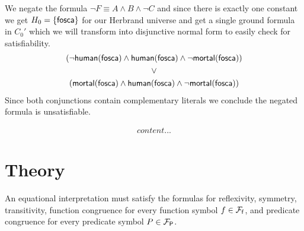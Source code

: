 

	We negate the formula $\lnot F \equiv A\land B \land\lnot C$ and since there is exactly one constant we get
	$H_0 = \{ \mathsf{fosca} \}$ for our Herbrand universe and get a single ground formula in $C_0'$
	which we will transform into 
	disjunctive normal form to easily check for satisfiability.
%
\begin{gather*}
(\lnot\mathsf{human}(\mathsf{fosca})\land\mathsf{human}(\mathsf{fosca})\land\lnot\mathsf{mortal}(\mathsf{fosca}))
\\ 
\lor
\\ 
(\mathsf{mortal}(\mathsf{fosca})\land\mathsf{human}(\mathsf{fosca})\land\lnot\mathsf{mortal}(\mathsf{fosca}))
\end{gather*}
Since both conjunctions contain complementary literals we conclude the negated formula is unsatisfiable.


\begin{gather*}
content...
\end{gather*}


\section{Theory}



	An equational interpretation must satisfy the formulas for reflexivity, symmetry, transitivity, 
	function congruence for every function symbol $f\in{{\mathcal F}_{\mathsf f}}$, 
	and predicate congruence for every predicate symbol $P\in{{\mathcal F}_{\mathsf P}}$.

%

